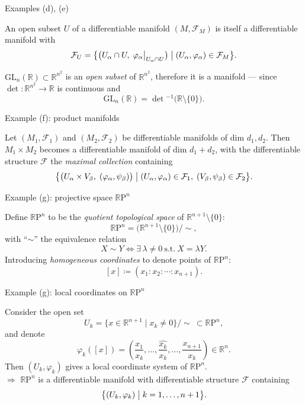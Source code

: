 \documentclass[10pt]{beamer}
\newcommand{\R}{\mathbb{R}}
\newcommand{\F}{\mathcal{F}}
\newcommand{\RP}{\mathbb{R}\mathrm{P}}
\begin{document}
\begin{frame}{Examples (d), (e)}
	\begin{example}
		An open subset $U$ of a differentiable manifold $(M, \F_M)$ is itself a
		differentiable manifold with
		\[
			\F_U = \bigl\{ \bigl(U_\alpha \cap U,\;
			\varphi_\alpha \big|_{U_\alpha \cap U}\bigr) \bigm|
			(U_\alpha, \varphi_\alpha) \in \F_M \bigr\}.
		\]
	\end{example}
	\begin{example}
		$\mathrm{GL}_n(\R) \subset \R^{n^2}$ is an \emph{open subset} of
		$\R^{n^2}$, therefore it is a manifold --- since
		$\det: \R^{n^2} \to \R$ is continuous and
		\[
			\mathrm{GL}_n(\R) = \det{}^{-1}\bigl(\R \setminus \{0\}\bigr).
		\]
	\end{example}
\end{frame}

\begin{frame}{Example (f): product manifolds}
	\begin{example}
		Let $(M_1, \F_1)$ and $(M_2, \F_2)$ be differentiable manifolds of dim
		$d_1, d_2$. Then $M_1 \times M_2$ becomes a differentiable manifold of
		dim $d_1 + d_2$, with the differentiable structure $\F$ the
		\emph{maximal collection} containing
		\[
			\bigl\{ \bigl(U_\alpha \times V_\beta,\; (\varphi_\alpha, \psi_\beta)\bigr)
			\bigm| (U_\alpha, \varphi_\alpha) \in \F_1,\;
			(V_\beta, \psi_\beta) \in \F_2 \bigr\}.
		\]
	\end{example}
\end{frame}

\begin{frame}{Example (g): projective space $\RP^n$}
	\begin{example}
		Define $\RP^n$ to be the \emph{quotient topological space} of
		$\R^{n+1} \setminus \{0\}$:
		\[
			\RP^n = \bigl(\R^{n+1} \setminus \{0\}\bigr) \big/ {\sim},
		\]
		with ``$\sim$'' the equivalence relation
		\[
			X \sim Y \iff \exists\, \lambda \neq 0 \ \text{s.t.}\ X = \lambda Y .
		\]
		Introducing \emph{homogeneous coordinates} to denote points of $\RP^n$:
		\[
			[x] \coloneqq (x_1 : x_2 : \cdots : x_{n+1}).
		\]
	\end{example}
\end{frame}

\begin{frame}{Example (g): local coordinates on $\RP^n$}
	\begin{example}
		Consider the open set
		\[
			U_k = \bigl\{ x \in \R^{n+1} \mid x_k \neq 0 \bigr\} \big/ {\sim}
			\ \subset \RP^n ,
		\]
		and denote
		\[
			\varphi_k([x]) = \left( \frac{x_1}{x_k}, \dots,
			\widehat{\frac{x_k}{x_k}}, \dots, \frac{x_{n+1}}{x_k} \right) \in \R^n .
		\]
		Then $(U_k, \varphi_k)$ gives a local coordinate system of $\RP^n$.\\
		$\Rightarrow$ $\RP^n$ is a differentiable manifold with differentiable
		structure $\F$ containing
		\[
			\bigl\{ (U_k, \varphi_k) \bigm| k = 1, \dots, n+1 \bigr\}.
		\]
	\end{example}
\end{frame}
\end{document}
